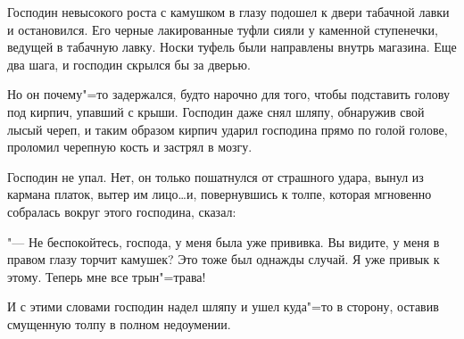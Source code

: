 Господин  невысокого роста с камушком  в
глазу подошел к двери табачной лавки и остановился. Его черные лакированные туфли сияли
у каменной ступенечки,  ведущей  в  табачную
лавку. Носки туфель были  направлены  внутрь
магазина.  Еще два шага,  и господин скрылся
бы за дверью.

    Но он почему"=то задержался, будто нарочно  для  того,  чтобы подставить голову  под
кирпич, упавший с крыши.  Господин даже снял
шляпу, обнаружив свой лысый череп,  и  таким
образом кирпич ударил господина прямо по голой голове,  проломил черепную кость и застрял в мозгу.

    Господин не упал.  Нет, он только пошатнулся от страшного удара,  вынул из  кармана
платок, вытер им лицо\dots  и,  повернувшись к
толпе,  которая мгновенно  собралась  вокруг
этого господина, сказал:

     "---  Не беспокойтесь, господа,  у меня была
 уже  прививка.  Вы видите,  у меня в  правом
глазу торчит камушек?  Это тоже был  однажды
случай. Я уже привык к этому. Теперь мне все
трын"=трава!

    И с этими словами господин надел шляпу и
ушел  куда"=то  в сторону, оставив  смущенную
толпу в полном недоумении.
